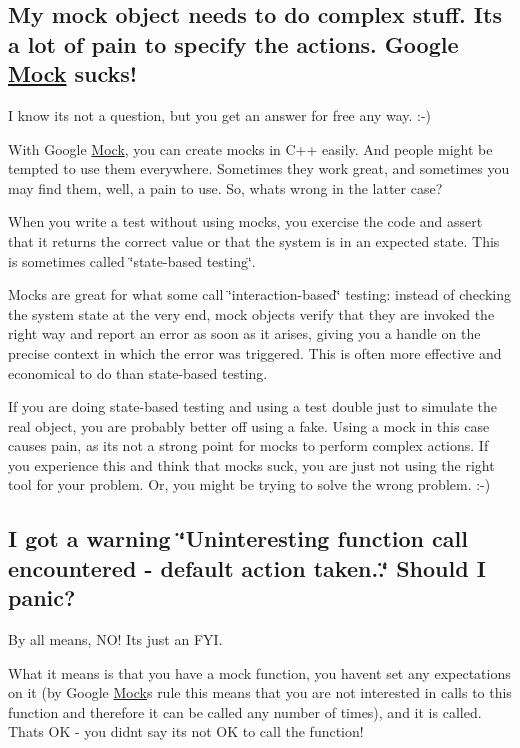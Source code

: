 \subsection*{My mock object needs to do complex stuff. It\textquotesingle{}s a lot of pain to specify the actions. Google \mbox{\hyperlink{class_mock}{Mock}} sucks!}

I know it\textquotesingle{}s not a question, but you get an answer for free any way. \+:-\/)

With Google \mbox{\hyperlink{class_mock}{Mock}}, you can create mocks in C++ easily. And people might be tempted to use them everywhere. Sometimes they work great, and sometimes you may find them, well, a pain to use. So, what\textquotesingle{}s wrong in the latter case?

When you write a test without using mocks, you exercise the code and assert that it returns the correct value or that the system is in an expected state. This is sometimes called \char`\"{}state-\/based testing\char`\"{}.

Mocks are great for what some call \char`\"{}interaction-\/based\char`\"{} testing\+: instead of checking the system state at the very end, mock objects verify that they are invoked the right way and report an error as soon as it arises, giving you a handle on the precise context in which the error was triggered. This is often more effective and economical to do than state-\/based testing.

If you are doing state-\/based testing and using a test double just to simulate the real object, you are probably better off using a fake. Using a mock in this case causes pain, as it\textquotesingle{}s not a strong point for mocks to perform complex actions. If you experience this and think that mocks suck, you are just not using the right tool for your problem. Or, you might be trying to solve the wrong problem. \+:-\/)

\subsection*{I got a warning \char`\"{}\+Uninteresting function call encountered -\/ default action taken..\char`\"{} Should I panic?}

By all means, N\+O! It\textquotesingle{}s just an F\+YI.

What it means is that you have a mock function, you haven\textquotesingle{}t set any expectations on it (by Google \mbox{\hyperlink{class_mock}{Mock}}\textquotesingle{}s rule this means that you are not interested in calls to this function and therefore it can be called any number of times), and it is called. That\textquotesingle{}s OK -\/ you didn\textquotesingle{}t say it\textquotesingle{}s not OK to call the function!

